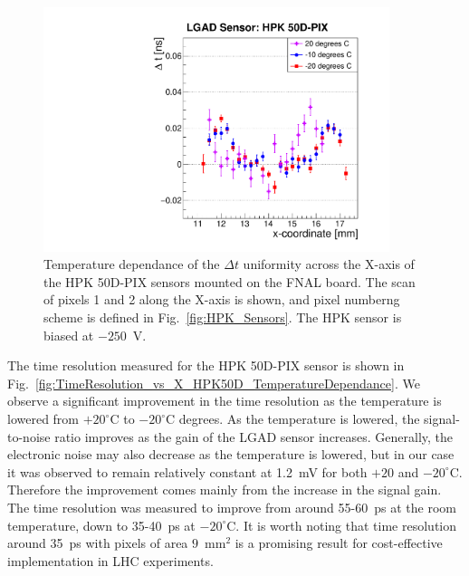 \documentclass[preprint,1p]{elsarticle}
\begin{document}
\begin{figure}[htbp] 
\centering
\includegraphics[width=0.9\textwidth]{figs/FNAL_MeanTime_vs_X_HPK50D_TemperatureDependance.pdf} 
\caption{Temperature dependance of the $\Delta t$ uniformity across
the X-axis of the HPK 50D-PIX sensors mounted on the FNAL board. The scan of
pixels 1 and 2 along the X-axis is shown, and pixel numberng scheme is defined
in Fig.~\ref{fig:HPK_Sensors}. The HPK sensor is biased at $-250$~V.} 
\label{fig:MeanTime_vs_X_HPK50D_TemperatureDependance} 
\end{figure} 

The time resolution measured for the HPK 50D-PIX sensor is shown in
Fig.~\ref{fig:TimeResolution_vs_X_HPK50D_TemperatureDependance}. We observe a
significant improvement in the time resolution as the temperature is lowered
from $+20^{\circ}$C to $-20^{\circ}$C degrees. As the temperature is lowered,
the signal-to-noise ratio improves as the gain of the LGAD sensor increases.
Generally, the electronic noise may also decrease as the temperature is lowered,
but in our case it was observed to remain relatively constant at 1.2~mV for both
$+20$ and $-20^{\circ}$C. Therefore the improvement comes mainly from the
increase in the signal gain. The time resolution was measured to improve from
around 55-60~ps at the room temperature, down to 35-40~ps at $-20^{\circ}$C. It
is worth noting that time resolution around 35~ps with pixels of area
$9$~$\mathrm{mm}^{2}$ is a promising result for cost-effective implementation in
LHC experiments.
\end{document}
